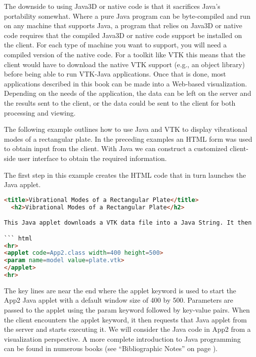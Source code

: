 The downside to using Java3D or native code is that it sacrifices Java’s portability somewhat. Where a pure Java program can be byte-compiled and run on any machine that supports Java, a program that relies on Java3D or native code requires that the compiled Java3D or native code support be installed on the client. For each type of machine you want to support, you will need a compiled version of the native code. For a toolkit like VTK this means that the client would have to download the native VTK support (e.g., an object library) before being able to run VTK-Java applications. Once that is done, most applications described in this book can be made into a Web-based visualization. Depending on the needs of the application, the data can be left on the server and the results sent to the client, or the data could be sent to the client for both processing and viewing.

The following example outlines how to use Java and VTK to display vibrational modes of a rectangular plate. In the preceding examples an HTML form was used to obtain input from the client. With Java we can construct a customized client-side user interface to obtain the required information.

The first step in this example creates the HTML code that in turn launches the Java applet.

\begin{lstlisting}[language=HTML, caption={}, numbers=none, frame=none]
<title>Vibrational Modes of a Rectangular Plate</title>
  <h2>Vibrational Modes of a Rectangular Plate</h2>

This Java applet downloads a VTK data file into a Java String. It then uses the InputString method of the VTK data reader to use this string as its data. Then it creates a filter pipeline that takes the original geometry and warps it according to the vector data. There are four sets of vector data in this example. They correspond to the first, second, fourth and eighth vibrational modes. The geometry is color based on the amount of displacement.

``` html
<hr>
<applet code=App2.class width=400 height=500>
<param name=model value=plate.vtk>
</applet>
<hr>
\end{lstlisting}

The key lines are near the end where the applet keyword is used to start the App2 Java applet with a default window size of 400 by 500. Parameters are passed to the applet using the param keyword followed by key-value pairs. When the client encounters the applet keyword, it then requests that Java applet from the server and starts executing it. We will consider the Java code in App2 from a visualization perspective. A more complete introduction to Java programming can be found in numerous books (see ``Bibliographic Notes'' on page \pageref{sec:ch11.bibliographic_notes}).

